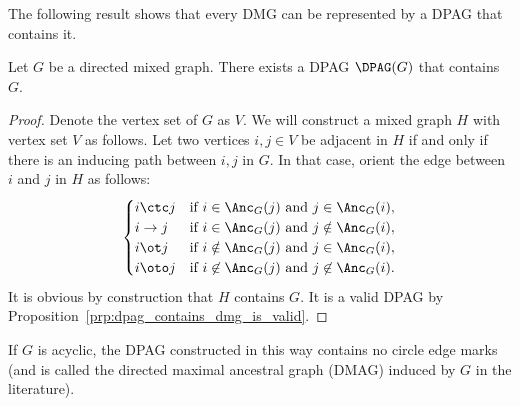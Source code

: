 The following result shows that every DMG can be represented by a DPAG that contains it.
\begin{Prp}
  Let $G$ be a directed mixed graph. There exists a DPAG $\DPAG(G)$ that contains $G$.
\end{Prp}
\begin{proof}
  Denote the vertex set of $G$ as $V$.
  We will construct a mixed graph $H$ with vertex set $V$ as follows.
  Let two vertices $i,j \in V$ be adjacent in $H$ if and only if there is an inducing path between $i,j$ in $G$.
  In that case, orient the edge between $i$ and $j$ in $H$ as follows:
    $$\begin{cases}
      \text{$i \ctc j$} & \text{if $i \in \Anc_G(j)$ and $j \in \Anc_G(i)$}, \\
      \text{$i \to  j$} & \text{if $i \in \Anc_G(j)$ and $j \notin \Anc_G(i)$}, \\
      \text{$i \ot  j$} & \text{if $i \notin \Anc_G(j)$ and $j \in \Anc_G(i)$}, \\
      \text{$i \oto j$} & \text{if $i \not\in \Anc_G(j)$ and $j \not\in \Anc_G(i)$.}
    \end{cases}$$
  It is obvious by construction that $H$ contains $G$.
  It is a valid DPAG by Proposition~\ref{prp:dpag_contains_dmg_is_valid}.
\end{proof}
If $G$ is acyclic, the DPAG constructed in this way contains no circle edge marks (and is called the directed maximal ancestral graph (DMAG) induced by $G$ in the literature).

